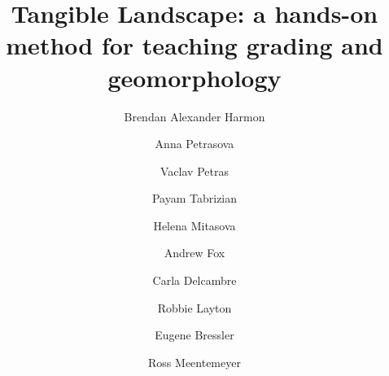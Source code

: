\documentclass[final,3p,times,twocolumn]{elsarticle}
\begin{document}
\begin{frontmatter}

\title{Tangible Landscape: a hands-on method for teaching grading and geomorphology}

\author[cga,la]{Brendan Alexander Harmon}


\author[cga,meas]{Anna Petrasova}

\author[cga,meas]{Vaclav Petras}

\author[cga,la]{Payam Tabrizian}

\author[cga,meas]{Helena Mitasova}

\author[la]{Andrew Fox}

\author[la]{Carla Delcambre}

\author[la]{Robbie Layton}

\author[la]{Eugene Bressler}

\author[cga,fer]{Ross Meentemeyer}

\address[cga]{Center for Geospatial Analytics, North Carolina State University, Raleigh, North Carolina, United States of America}
\address[la]{Department of Landscape Architecture, North Carolina State University, Raleigh, North Carolina, United States of America}
\address[meas]{Department of Marine, Earth, and Atmospheric Sciences, North Carolina State University, Raleigh, North Carolina, United States of America}
\address[fer]{Department of Forestry and Environmental Resources, North Carolina State University, Raleigh, North Carolina, United States of America}



\end{frontmatter}
\end{document}
